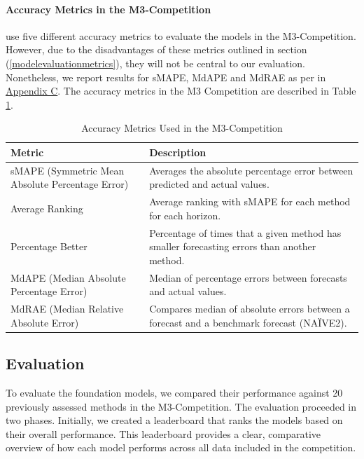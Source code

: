 \documentclass[12pt,a4paper]{article}
\begin{document}
\paragraph{Accuracy Metrics in the M3-Competition}

\cite{MAKRIDAKIS2000} use five different accuracy metrics to evaluate the models in the M3-Competition. However, due to the disadvantages of these metrics outlined in section (\ref{modelevaluationmetrics}), they will not be central to our evaluation. Nonetheless, we report results for sMAPE, MdAPE and MdRAE as per \cite{MAKRIDAKIS2000} in \hyperref[appendix_c]{Appendix C}. The accuracy metrics in the M3 Competition are described in Table \ref{forecasting_metrics_m3}. 

\begin{table}[htbp]
  \centering
  \caption{Accuracy Metrics Used in the M3-Competition}
  \label{forecasting_metrics_m3}
  \begin{tabularx}{\textwidth}{lX}  %
  \toprule
  \textbf{Metric}                                           & \textbf{Description} \\
  \midrule
  sMAPE (Symmetric Mean Absolute Percentage Error)          & Averages the absolute percentage error between predicted and actual values. \\
  \hline
  Average Ranking                                           & Average ranking with sMAPE for each method for each horizon. \\
  \hline
  Percentage Better                                         & Percentage of times that a given method has smaller forecasting errors than another method. \\
  \hline
  MdAPE (Median Absolute Percentage Error)                  & Median of percentage errors between forecasts and actual values. \\
  \hline
  MdRAE (Median Relative Absolute Error)                    & Compares median of absolute errors between a forecast and a benchmark forecast (NAÏVE2). \\
  \bottomrule
  \end{tabularx}
\end{table}

\subsection{Evaluation}
To evaluate the foundation models, we compared their performance against 20 previously assessed methods in the M3-Competition. The evaluation proceeded in two phases. Initially, we created a leaderboard that ranks the models based on their overall performance. This leaderboard provides a clear, comparative overview of how each model performs across all data included in the competition.
\end{document}
